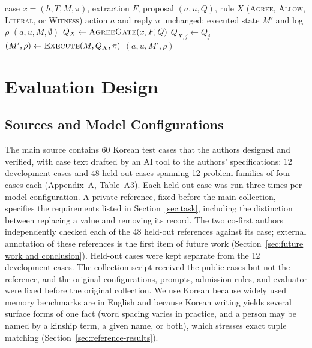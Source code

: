 \documentclass[acmsmall,review]{acmart}
\newcommand{\agree}{\textsc{Agree}}
\newcommand{\allow}{\textsc{Allow}}
\newcommand{\literal}{\textsc{Literal}}
\newcommand{\witness}{\textsc{Witness}}
\begin{document}
\begin{algorithm}[tbp]
\caption{Admission on a fixed proposal. Reply rendering is a separate downstream option.}\label{alg:1}
\begin{algorithmic}[1]
\Require case $x=(h,T,M,\pi)$, extraction $F$, proposal $(a,u,Q)$, rule $X$ (\agree{}, \allow{}, \literal{}, or \witness{})
\Ensure action $a$ and reply $u$ unchanged; executed state $M'$ and log $\rho$
  \State \Return $(a,u,M,\emptyset)$ 
\EndIf
\State $Q_X \gets \textsc{AgreeGate}(x,F,Q)$ 
  \If{$X=\allow$ \textbf{or} ($X=\literal$ \textbf{and} $L_j=1$) \textbf{or} ($X=\witness$ \textbf{and} $W_j=1$)}
    \State $Q_{X,j}\gets Q_j$ 
  \EndIf
\EndFor
\State $(M',\rho)\gets \textsc{Execute}(M,Q_X,\pi)$
\State \Return $(a,u,M',\rho)$
\end{algorithmic}
\end{algorithm}

\section{Evaluation Design}\label{sec:design}
\subsection{Sources and Model Configurations}\label{sec:sources}
The main source contains 60 Korean test cases that the authors designed and verified, with case text drafted by an AI tool to the authors' specifications: 12 development cases and 48 held-out cases spanning 12 problem families of four cases each (Appendix~A, Table~A3). Each held-out case was run three times per model configuration. A private reference, fixed before the main collection, specifies the requirements listed in Section~\ref{sec:task}, including the distinction between replacing a value and removing its record. The two co-first authors independently checked each of the 48 held-out references against its case; external annotation of these references is the first item of future work (Section~\ref{sec:future work and conclusion}). Held-out cases were kept separate from the 12 development cases. The collection script received the public cases but not the reference, and the original configurations, prompts, admission rules, and evaluator were fixed before the original collection. We use Korean because widely used memory benchmarks are in English \cite{cite20,cite37} and because Korean writing yields several surface forms of one fact (word spacing varies in practice, and a person may be named by a kinship term, a given name, or both), which stresses exact tuple matching (Section~\ref{sec:reference-results}).
\end{document}
